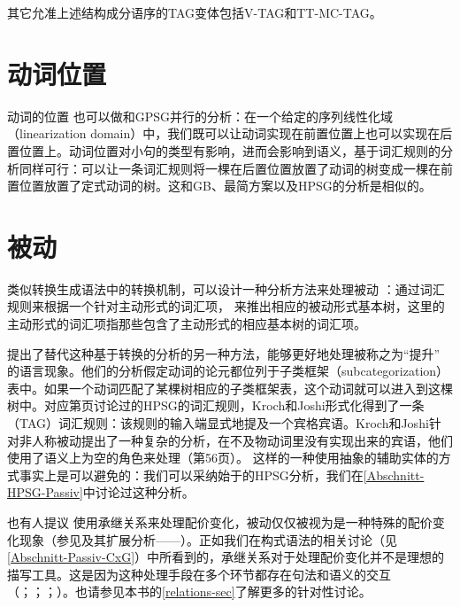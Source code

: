 其它允准上述结构成分语序的TAG变体包括V-TAG\citep{Rambow94a}和TT-MC-TAG\citep{Lichte2007a}。

\section{动词位置}

动词的位置
也可以做和GPSG并行的分析：在一个给定的序列线性化域（linearization domain）中，我们既可以让动词实现在前置位置上也可以实现在后置位置上。动词位置对小句的类型有影响，进而会影响到语义，基于词汇规则的分析同样可行：可以让一条词汇规则将一棵在后置位置放置了动词的树变成一棵在前置位置放置了定式动词的树。这和GB、最简方案以及HPSG的分析是相似的。 

\section{被动}

类似转换生成语法中的转换机制，可以设计一种分析方法来处理被动
：通过词汇规则来根据一个针对主动形式的词汇项，
来推出相应的被动形式基本树\citep[--51]{KJ85a}，这里的主动形式的词汇项指那些包含了主动形式的相应基本树的词汇项。

\citet[]{KJ85a}提出了替代这种基于转换的分析的另一种方法，能够更好地处理被称之为“提升”
的语言现象。他们的分析假定动词的论元都位列于子类框架（subcategorization）表中。如果一个动词匹配了某棵树相应的子类框架表，这个动词就可以进入到这棵树中。对应第\pageref{pass-lr-mlr}页讨论过的HPSG的词汇规则，Kroch和Joshi形式化得到了一条（TAG）词汇规则：该规则的输入端显式地提及一个宾格宾语。Kroch和Joshi针对非人称被动提出了一种复杂的分析，在不及物动词里没有实现出来的宾语，他们使用了语义上为空的角色来处理（第56页）。
这样的一种使用抽象的辅助实体的方式事实上是可以避免的：我们可以采纳始于\citet{Haider86}的HPSG\indexhpsgc 分析，我们在\ref{Abschnitt-HPSG-Passiv}中讨论过这种分析。

也有人提议
使用承继关系来处理配价变化，被动仅仅被视为是一种特殊的配价变化现象（参见\citealp{Candito96a}及其扩展分析——\citealp*{KSYJ2006a}）。正如我们在构式语法的相关讨论（见\ref{Abschnitt-Passiv-CxG}）中所看到的，承继关系对于处理配价变化并不是理想的描写工具。这是因为这种处理手段在多个环节都存在句法和语义的交互（\citealp{Mueller2006d,Mueller2007d}；\citeyear[\S~7.5.2]{MuellerLehrbuch1}；\citeyear{MuellerUnifying}；\citeyear{MWArgSt}）。也请参见本书的\ref{relations-sec}了解更多的针对性讨论。 

